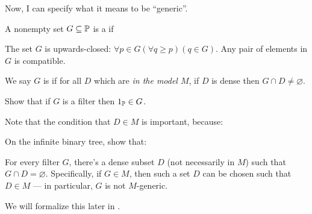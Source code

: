 Now, I can specify what it means to be ``generic''.
\begin{definition}
	A nonempty set $G \subseteq \mathbb P$ is a  if
	\begin{enumerate}[(a)]
		\ii The set $G$ is upwards-closed:
		$\forall p \in G (\forall q \ge p) (q \in G)$.
		\ii Any pair of elements in $G$ is compatible.
	\end{enumerate}
	We say $G$ is  if for all $D$ which are \emph{in the model $M$},
	if $D$ is dense then $G \cap D \neq \varnothing$.
\end{definition}
\begin{ques}
	Show that if $G$ is a filter then $1_\mathbb P \in G$.
\end{ques}
Note that the condition that $D \in M$ is important, because:
\begin{ques}
	On the infinite binary tree, show that:
	\begin{itemize}
		\ii For every filter $G$, there's a dense subset $D$ (not
		necessarily in $M$) such that $G \cap D = \varnothing$.
		\ii Specifically, if $G \in M$, then such a set $D$ can be chosen such that $D \in M$ --- in
		particular, $G$ is not $M$-generic.
	\end{itemize}
	We will formalize this later in .
\end{ques}

